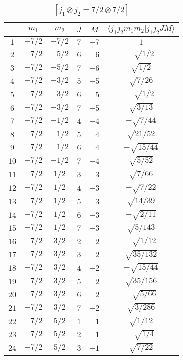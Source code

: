\begin{table}
\tiny
\caption{$[j_1 \otimes j_2 = 7/2 \otimes 7/2]$}
\begin{center}
\begin{tabular}{|c|c|c|c|c|c|}
\hline 
   & $m_1$ & $m_2$ & $J$ & $M$ & $\langle j_1 j_2 m_1 m_2 | j_1 j_2 J M \rangle$ \\ 
\hline 
$1$ & $-7/2$ & $-7/2$ & $7$ & $-7$ & $1$ \\ 
$2$ & $-7/2$ & $-5/2$ & $6$ & $-6$ & $-\sqrt{1/2}$ \\ 
$3$ & $-7/2$ & $-5/2$ & $7$ & $-6$ & $\sqrt{1/2}$ \\ 
$4$ & $-7/2$ & $-3/2$ & $5$ & $-5$ & $\sqrt{7/26}$ \\ 
$5$ & $-7/2$ & $-3/2$ & $6$ & $-5$ & $-\sqrt{1/2}$ \\ 
$6$ & $-7/2$ & $-3/2$ & $7$ & $-5$ & $\sqrt{3/13}$ \\ 
$7$ & $-7/2$ & $-1/2$ & $4$ & $-4$ & $-\sqrt{7/44}$ \\ 
$8$ & $-7/2$ & $-1/2$ & $5$ & $-4$ & $\sqrt{21/52}$ \\ 
$9$ & $-7/2$ & $-1/2$ & $6$ & $-4$ & $-\sqrt{15/44}$ \\ 
$10$ & $-7/2$ & $-1/2$ & $7$ & $-4$ & $\sqrt{5/52}$ \\ 
$11$ & $-7/2$ & $1/2$ & $3$ & $-3$ & $\sqrt{7/66}$ \\ 
$12$ & $-7/2$ & $1/2$ & $4$ & $-3$ & $-\sqrt{7/22}$ \\ 
$13$ & $-7/2$ & $1/2$ & $5$ & $-3$ & $\sqrt{14/39}$ \\ 
$14$ & $-7/2$ & $1/2$ & $6$ & $-3$ & $-\sqrt{2/11}$ \\ 
$15$ & $-7/2$ & $1/2$ & $7$ & $-3$ & $\sqrt{5/143}$ \\ 
$16$ & $-7/2$ & $3/2$ & $2$ & $-2$ & $-\sqrt{1/12}$ \\ 
$17$ & $-7/2$ & $3/2$ & $3$ & $-2$ & $\sqrt{35/132}$ \\ 
$18$ & $-7/2$ & $3/2$ & $4$ & $-2$ & $-\sqrt{15/44}$ \\ 
$19$ & $-7/2$ & $3/2$ & $5$ & $-2$ & $\sqrt{35/156}$ \\ 
$20$ & $-7/2$ & $3/2$ & $6$ & $-2$ & $-\sqrt{5/66}$ \\ 
$21$ & $-7/2$ & $3/2$ & $7$ & $-2$ & $\sqrt{3/286}$ \\ 
$22$ & $-7/2$ & $5/2$ & $1$ & $-1$ & $\sqrt{1/12}$ \\ 
$23$ & $-7/2$ & $5/2$ & $2$ & $-1$ & $-\sqrt{1/4}$ \\ 
$24$ & $-7/2$ & $5/2$ & $3$ & $-1$ & $\sqrt{7/22}$ \\ 

\end{tabular}
\end{center}
\end{table}
